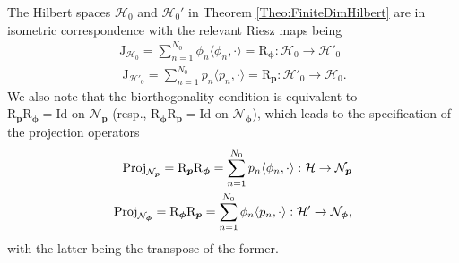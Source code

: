 \documentclass[11pt, english,english]{article}
\def\V#1{{\boldsymbol{#1}}}         %
\def\Spc#1{{\mathcal{#1}}}  %
\def\Op#1{{\mathrm{#1}}}  %
\def\Identity{\mathrm{Id}} %
\renewcommand{\[}{\begin{equation}}
\renewcommand{\]}[1]{\label{eq:#1}\end{equation}}
\begin{document}
The Hilbert spaces $\Spc H_0$ and $\Spc H_0'$ in Theorem \ref{Theo:FiniteDimHilbert} are in isometric correspondence with the relevant Riesz maps being
\begin{align}
\Op J_{\Spc H_0}=\sum_{n=1}^{N_0} \phi_n \langle \phi_n,\cdot \rangle=\Op R_{\V \phi}: \Spc H_0 \to \Spc H'_0\\\
\Op J_{\Spc H'_0}=\sum_{n=1}^{N_0} p_n \langle p_n,\cdot \rangle=\Op R_{\V p}: \Spc H'_0 \to \Spc H_0.
\end{align}
We also note that the biorthogonality condition 
 is equivalent to $\Op R_{\V p}\Op R_{\V \phi}=\Identity \mbox{ on } \Spc N_{\V p}$ (resp., $\Op R_{\V \phi}\Op R_{\V p}=\Identity \mbox{ on } \Spc N_{\V \phi}$), which leads to the specification of the projection operators
\begin{align}
{\rm Proj}_{\Spc N_\V p}=\Op R_{\V p}\Op R_{\V \phi}=\sum_{n=1}^{N_0} p_n \langle \phi_n,\cdot \rangle: \Spc H \to \Spc N_{\V p}\\
{\rm Proj}_{\Spc N_\V \phi}=\Op R_{\V \phi}\Op R_{\V p}=\sum_{n=1}^{N_0} \phi_n \langle p_n,\cdot \rangle: \Spc H' \to \Spc N_{\V \phi},
%
\end{align}
with the latter being the transpose of the former.
\end{document}
